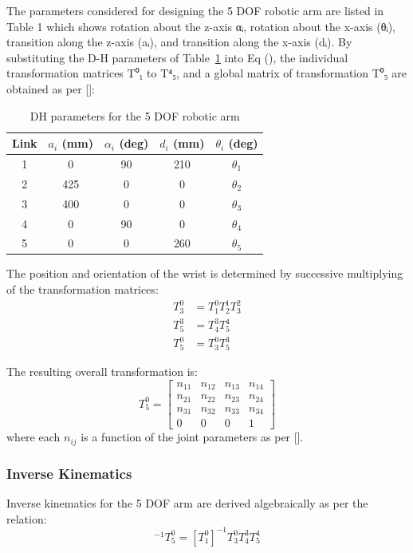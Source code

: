 \documentclass[letterpaper, 10 pt, conference]{ieeeconf}  %
\begin{document}
The parameters considered for designing the 5 DOF robotic arm are listed in Table 1 which shows rotation about the z-axis αᵢ, rotation about the x-axis (θᵢ), transition along the z-axis (aᵢ), and transition along the x-axis (dᵢ). By substituting the D-H parameters of Table~\ref{tab:dh} into Eq (), the individual transformation matrices T⁰₁ to T⁴₅, and a global matrix of transformation T⁰₅ are obtained as per []:

\begin{table}[h!]
\centering
\renewcommand{\arraystretch}{1.2}
\begin{tabular}{|c|c|c|c|c|}
\hline
Link & $a_i$ (mm) & $\alpha_i$ (deg) & $d_i$ (mm) & $\theta_i$ (deg) \\
\hline
1 & 0   & 90 & 210   & $\theta_1$ \\
2 & 425 & 0  & 0     & $\theta_2$ \\
3 & 400 & 0  & 0     & $\theta_3$ \\
4 & 0   & 90 & 0     & $\theta_4$ \\
5 & 0   & 0  & 260 & $\theta_5$ \\
\hline
\end{tabular}
\caption{DH parameters for the 5 DOF robotic arm}
\label{tab:dh}
\end{table}
The position and orientation of the wrist is determined by successive multiplying of the transformation matrices:
\begin{align}
T^0_3 &= T^0_1 T^1_2 T^2_3 \\
T^3_5 &= T^3_4 T^4_5\\
T^0_5 &= T^0_3 T^3_5
\end{align}

The resulting overall transformation is:
\begin{equation}
T^0_5 =
\begin{bmatrix}
n_{11} & n_{12} & n_{13} & n_{14} \\
n_{21} & n_{22} & n_{23} & n_{24} \\
n_{31} & n_{32} & n_{33} & n_{34} \\
0 & 0 & 0 & 1
\end{bmatrix}
\end{equation}
where each $n_{ij}$ is a function of the joint parameters as per [].

\subsubsection{Inverse Kinematics}

Inverse kinematics for the 5 DOF arm are derived algebraically as per the relation:
\begin{equation}
[T^0_1]^{-1} T^0_5 = [T^0_1]^{-1} T^0_3 T^3_4 T^4_5
\end{equation}
\end{document}
